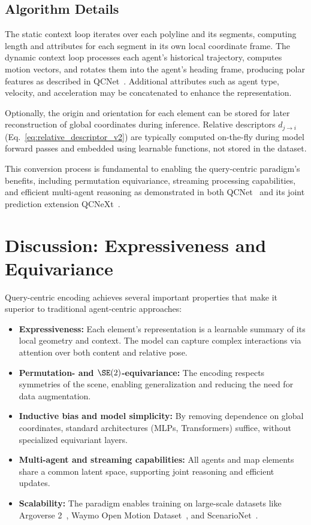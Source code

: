 \subsection*{Algorithm Details}
The static context loop iterates over each polyline and its segments, computing length and attributes for each segment in its own local coordinate frame. The dynamic context loop processes each agent's historical trajectory, computes motion vectors, and rotates them into the agent's heading frame, producing polar features as described in QCNet~\cite{Zhou2023QueryCentric}. Additional attributes such as agent type, velocity, and acceleration may be concatenated to enhance the representation.

Optionally, the origin and orientation for each element can be stored for later reconstruction of global coordinates during inference. Relative descriptors $d_{j \to i}$ (Eq.~\eqref{eq:relative_descriptor_v2}) are typically computed on-the-fly during model forward passes and embedded using learnable functions, not stored in the dataset.

This conversion process is fundamental to enabling the query-centric paradigm's benefits, including permutation equivariance, streaming processing capabilities, and efficient multi-agent reasoning as demonstrated in both QCNet~\cite{Zhou2023QueryCentric} and its joint prediction extension QCNeXt~\cite{qcnextZhou2023}.

\section{Discussion: Expressiveness and Equivariance}
Query-centric encoding achieves several important properties that make it superior to traditional agent-centric approaches:

\begin{itemize}
    \item \textbf{Expressiveness:} Each element's representation is a learnable summary of its local geometry and context. The model can capture complex interactions via attention over both content and relative pose.
    \item \textbf{Permutation- and $\SE(2)$-equivariance:} The encoding respects symmetries of the scene, enabling generalization and reducing the need for data augmentation.
    \item \textbf{Inductive bias and model simplicity:} By removing dependence on global coordinates, standard architectures (MLPs, Transformers) suffice, without specialized equivariant layers.
    \item \textbf{Multi-agent and streaming capabilities:} All agents and map elements share a common latent space, supporting joint reasoning and efficient updates.
    \item \textbf{Scalability:} The paradigm enables training on large-scale datasets like Argoverse 2~\cite{av2Wilson2023}, Waymo Open Motion Dataset~\cite{wmodSun2020}, and ScenarioNet~\cite{scenarionetLi2023}.
\end{itemize}

